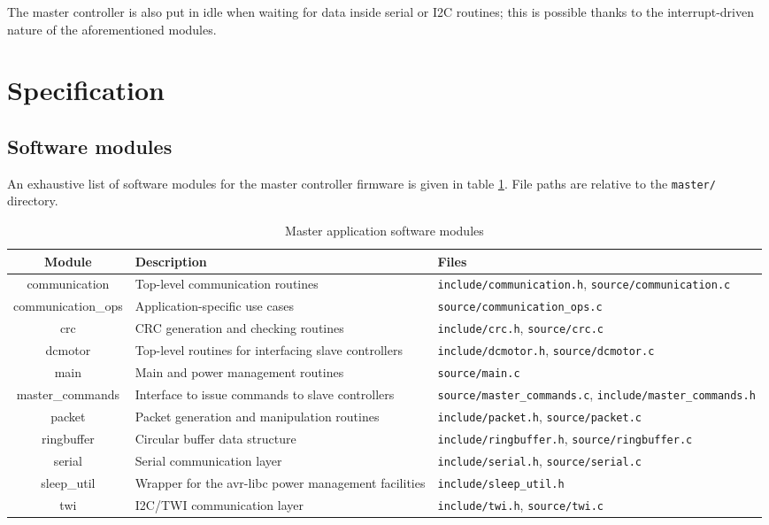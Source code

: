 The master controller is also put in idle when waiting for data inside serial
or I2C routines; this is possible thanks to the interrupt-driven nature of the
aforementioned modules.

\section{Specification}

\subsection{Software modules}
An exhaustive list of software modules for the master controller firmware is
given in table \ref{tab:master-spec-modules}. File paths are relative to the
\texttt{master/} directory.

\begin{table}[bth]
  \begin{tabularx}{\textwidth}{c X X}
    \toprule
    Module & Description & Files \\
    \midrule
    communication &
      Top-level communication routines &
      \texttt{include/communication.h},
      \texttt{source/communication.c} \\
    communication\_ops &
      Application-specific use cases &
      \texttt{source/communication\_ops.c} \\
    crc &
      CRC generation and checking routines &
      \texttt{include/crc.h},
      \texttt{source/crc.c} \\
    dcmotor &
      Top-level routines for interfacing slave controllers &
      \texttt{include/dcmotor.h},
      \texttt{source/dcmotor.c} \\
    main &
      Main and power management routines &
      \texttt{source/main.c} \\
    master\_commands &
      Interface to issue commands to slave controllers &
      \texttt{source/master\_commands.c},
      \texttt{include/master\_commands.h} \\
    packet &
      Packet generation and manipulation routines &
      \texttt{include/packet.h},
      \texttt{source/packet.c} \\
    ringbuffer &
      Circular buffer data structure &
      \texttt{include/ringbuffer.h},
      \texttt{source/ringbuffer.c} \\
    serial &
      Serial communication layer &
      \texttt{include/serial.h},
      \texttt{source/serial.c} \\
    sleep\_util &
      Wrapper for the avr-libc power management facilities &
      \texttt{include/sleep\_util.h} \\
    twi &
      I2C/TWI communication layer &
      \texttt{include/twi.h},
      \texttt{source/twi.c} \\
    \bottomrule
  \end{tabularx}
  \caption{Master application software modules}
  \label{tab:master-spec-modules}
\end{table}

